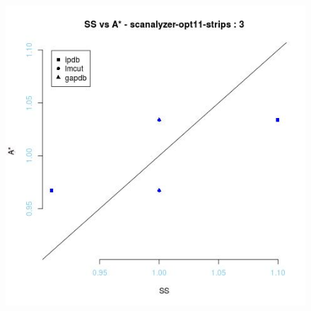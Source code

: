 \begin{figure}[!htb]
\endminipage\hfill
{}
  \includegraphics[width=\linewidth]{images/scanalyzer-opt11-strips}
\endminipage\hfill


\end{figure}
